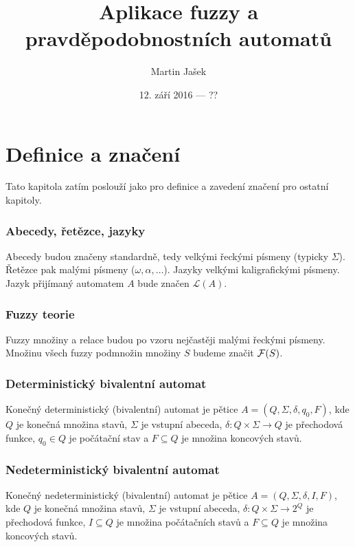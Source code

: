 \documentclass[a4paper,10pt]{article}
\title{Aplikace fuzzy a pravděpodobnostních automatů}
\author{Martin Jašek}
\date{12. září 2016 --- ??}
\begin{document}
\maketitle
\tableofcontents
\newpage

\section{Definice a značení}
Tato kapitola zatím poslouží jako  pro definice a zavedení značení pro ostatní kapitoly.

\subsubsection*{Abecedy, řetězce, jazyky}
Abecedy budou značeny standardně, tedy velkými řeckými písmeny (typicky $\Sigma$). Řetězce pak malými písmeny ($\omega, \alpha, \dots$). Jazyky velkými kaligrafickými písmeny. Jazyk přijímaný automatem $A$ bude značen $\mathcal{L}(A)$.

\subsubsection*{Fuzzy teorie}
Fuzzy množiny a relace budou po vzoru \cite{AstGonMenGar-FuzzAutEpsMovCmpFuzzMeasBtwStrs} nejčastěji malými řeckými písmeny. Množinu všech fuzzy podmnožin množiny $S$ budeme značit $\mathcal{F}(S)$.

\subsubsection*{Deterministický bivalentní automat}
\begin{definition}
 Konečný deterministický (bivalentní) automat je pětice $A = ( Q, \Sigma, \delta, q_0, F )$, kde $Q$ je konečná množina stavů, $\Sigma$ je vstupní abeceda, $\delta: Q \times \Sigma \rightarrow Q$ je přechodová funkce, $q_0 \in Q$ je počátační stav a $F \subseteq Q$ je množina koncových stavů.
\end{definition}


\subsubsection*{Nedeterministický bivalentní automat}
\begin{definition}
 Konečný nedeterministický (bivalentní) automat je pětice $A = ( Q, \Sigma, \delta, I, F )$, kde $Q$ je konečná množina stavů, $\Sigma$ je vstupní abeceda, $\delta: Q \times \Sigma \rightarrow 2^Q$ je přechodová funkce, $I \subseteq Q$ je množina počátačních stavů a $F \subseteq Q$ je množina koncových stavů.
\end{definition}
\end{document}
